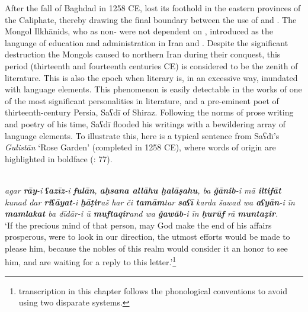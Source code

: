 \documentclass[output=paper]{langsci/langscibook}
\begin{document}
After the fall of Baghdad in 1258 CE,  lost its foothold in the eastern provinces of the Caliphate, thereby drawing the final boundary between the use of  and  \citep{Danner2000}. The Mongol Ilkhānids, who as non- were not dependent on , introduced  as the language of education and administration in Iran and . Despite the significant destruction the Mongols caused to northern Iran during their conquest, this period (thirteenth and fourteenth centuries CE) is considered to be the zenith of  literature. This is also the epoch when literary  is, in an excessive way, inundated with  language elements. This phenomenon is easily detectable in the works of one of the most significant personalities in   literature, and a pre-eminent poet of thirteenth-century Persia, Saʕdī of Shiraz. Following the norms of  prose writing and poetry of his time, Saʕdī flooded his writings with a bewildering array of  language elements. To illustrate this, here is a typical sentence from Saʕdī’s \textit{Gulistān} ‘Rose Garden’ (completed in 1258 CE), where words of  origin are highlighted in boldface (\citealt{Yūsifī2004}: 77).


\ea
{}\\
{\itshape agar \textbf{rāy}-i \textbf{ʕazīz}-i \textbf{fulān}, \textbf{aḥsana allāhu ḫalāṣahu}, ba \textbf{ǧānib}-i mā \textbf{iltifāt} kunad dar \textbf{riʕāyat}-i \textbf{ḫāṭir}aš har či \textbf{tamām}tar \textbf{saʕī}  karda  šawad wa \textbf{aʕyān}-i īn \textbf{mamlakat} ba dīdār-i ū \textbf{muftaqir}and wa \textbf{ǧawāb}-i īn \textbf{ḥurūf} rā \textbf{muntaẓir}.}\\
\glt ‘If the precious mind of that person, may God make the end of his affairs prosperous, were to look in our direction, the utmost efforts would be made to please him, because the nobles of this realm would consider it an honor to see him, and are waiting for a reply to this letter.’\footnote{ transcription in this chapter follows the  phonological conventions to avoid using two disparate systems.}
\z
\end{document}
